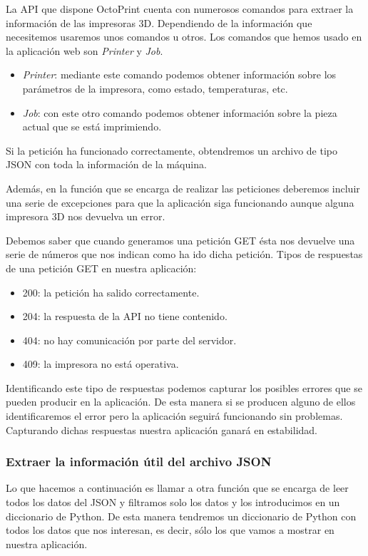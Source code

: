 La API que dispone OctoPrint cuenta con numerosos comandos para extraer la información de las impresoras 3D. Dependiendo de la información que necesitemos usaremos unos comandos u otros. Los comandos que hemos usado en la aplicación web son \textit{Printer} y \textit{Job}.
\begin{itemize}
\item \textit{Printer}: mediante este comando podemos obtener información sobre los parámetros de la impresora, como estado, temperaturas, etc.

\item \textit{Job}: con este otro comando podemos obtener información sobre la pieza actual que se está imprimiendo.

\end{itemize}
 
Si la petición ha funcionado correctamente, obtendremos un archivo de tipo JSON con toda la información de la máquina. 

Además, en la función que se encarga de realizar las peticiones deberemos incluir una serie de excepciones para que la aplicación siga funcionando aunque alguna impresora 3D nos devuelva un error. 

Debemos saber que cuando generamos una petición GET ésta nos devuelve una serie de números que nos indican como ha ido dicha petición. Tipos de respuestas de una petición GET en nuestra aplicación:
\begin{itemize}
\item 200: la petición ha salido correctamente.
\item 204: la respuesta de la API no tiene contenido.
\item 404: no hay comunicación por parte del servidor.
\item 409: la impresora no está operativa.
\end{itemize}

Identificando este tipo de respuestas podemos capturar los posibles errores que se pueden producir en la aplicación. De esta manera si se producen alguno de ellos identificaremos el error pero la aplicación seguirá funcionando sin problemas. Capturando dichas respuestas nuestra aplicación ganará en estabilidad.

\subsubsection{Extraer la información útil del archivo JSON}

Lo que hacemos a continuación es llamar a otra función que se encarga de leer todos los datos del JSON y filtramos solo los datos y los introducimos en un diccionario de Python. De esta manera tendremos un diccionario de Python con todos los datos que nos interesan, es decir, sólo los que vamos a mostrar en nuestra aplicación.

